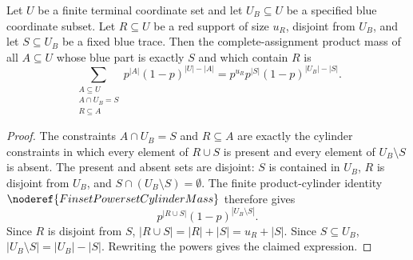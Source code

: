 \begin{helper}
Let \(U\) be a finite terminal coordinate set and let \(U_B\subseteq U\) be a
specified blue coordinate subset.  Let \(R\subseteq U\) be a red support of
size \(u_R\), disjoint from \(U_B\), and let \(S\subseteq U_B\) be a fixed
blue trace.  Then the complete-assignment product mass of all
\(A\subseteq U\) whose blue part is exactly \(S\) and which contain \(R\) is
\[
\sum_{\substack{A\subseteq U\\ A\cap U_B=S\\ R\subseteq A}}
  p^{|A|}(1-p)^{|U|-|A|}
=
p^{u_R}p^{|S|}(1-p)^{|U_B|-|S|}.
\]
\end{helper}
\begin{proof}
The constraints \(A\cap U_B=S\) and \(R\subseteq A\) are exactly the cylinder
constraints in which every element of \(R\cup S\) is present and every element
of \(U_B\setminus S\) is absent.  The present and absent sets are disjoint:
\(S\) is contained in \(U_B\), \(R\) is disjoint from \(U_B\), and
\(S\cap(U_B\setminus S)=\emptyset\).  The finite product-cylinder identity
\(\noderef{FinsetPowersetCylinderMass}\) therefore gives
\[
p^{|R\cup S|}(1-p)^{|U_B\setminus S|}.
\]
Since \(R\) is disjoint from \(S\), \(|R\cup S|=|R|+|S|=u_R+|S|\).  Since
\(S\subseteq U_B\), \(|U_B\setminus S|=|U_B|-|S|\).  Rewriting the powers
gives the claimed expression.
\end{proof}
